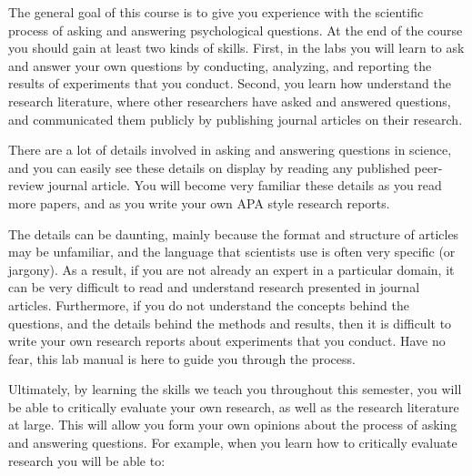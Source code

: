 

The general goal of this course is to give you experience with the scientific process of asking and answering psychological questions. At the end of the course you should gain at least two kinds of skills. First, in the labs you will learn to ask and answer your own questions by conducting, analyzing, and reporting the results of experiments that you conduct. Second, you learn how understand the research literature, where other researchers have asked and answered questions, and communicated them publicly by publishing journal articles on their research.

There are a lot of details involved in asking and answering questions in science, and you can easily see these details on display by reading any published peer-review journal article. You will become very familiar these details as you read more papers, and as you write your own APA style research reports.

The details can be daunting, mainly because the format and structure of articles may be unfamiliar, and the language that scientists use is often very specific (or jargony). As a result, if you are not already an expert in a particular domain, it can be very difficult to read and understand research presented in journal articles. Furthermore, if you do not understand the concepts behind the questions, and the details behind the methods and results, then it is difficult to write your own research reports about experiments that you conduct. Have no fear, this lab manual is here to guide you through the process. 

Ultimately, by learning the skills we teach you throughout this semester, you will be able to critically evaluate your own research, as well as the research literature at large. This will allow you form your own opinions about the process of asking and answering questions. For example, when you learn how to critically evaluate research you will be able to:
 
